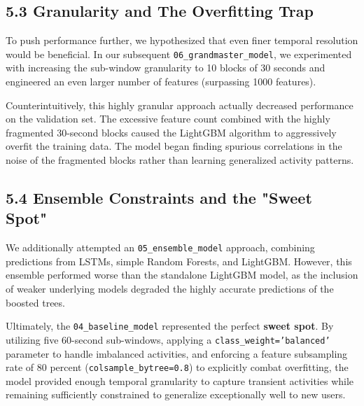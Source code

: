 \documentclass[12pt, a4paper]{article}
\begin{document}
\subsection*{5.3 Granularity and The Overfitting Trap}
To push performance further, we hypothesized that even finer temporal resolution would be beneficial. In our subsequent \texttt{06\_grandmaster\_model}, we experimented with increasing the sub-window granularity to 10 blocks of 30 seconds and engineered an even larger number of features (surpassing 1000 features). 

Counterintuitively, this highly granular approach actually decreased performance on the validation set. The excessive feature count combined with the highly fragmented 30-second blocks caused the LightGBM algorithm to aggressively overfit the training data. The model began finding spurious correlations in the noise of the fragmented blocks rather than learning generalized activity patterns. 

\subsection*{5.4 Ensemble Constraints and the "Sweet Spot"}
We additionally attempted an \texttt{05\_ensemble\_model} approach, combining predictions from LSTMs, simple Random Forests, and LightGBM. However, this ensemble performed worse than the standalone LightGBM model, as the inclusion of weaker underlying models degraded the highly accurate predictions of the boosted trees.

Ultimately, the \texttt{04\_baseline\_model} represented the perfect \textbf{sweet spot}. By utilizing five 60-second sub-windows, applying a \texttt{class\_weight='balanced'} parameter to handle imbalanced activities, and enforcing a feature subsampling rate of 80 percent (\texttt{colsample\_bytree=0.8}) to explicitly combat overfitting, the model provided enough temporal granularity to capture transient activities while remaining sufficiently constrained to generalize exceptionally well to new users.
\end{document}
